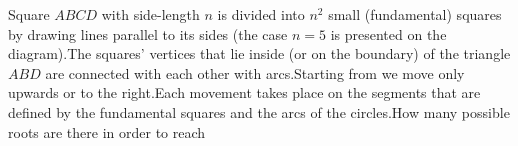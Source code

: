 Square $ABCD$ with side-length $n$ is divided into $n^2$ small (fundamental) squares by drawing lines parallel to its sides (the case $n=5$ is presented on the diagram).The squares' vertices that lie inside (or on the boundary) of the triangle $ABD$ are connected with each other with arcs.Starting from we move only upwards or to the right.Each movement takes place on the segments that are defined by the fundamental squares and the arcs of the circles.How many possible roots are there in order to reach 